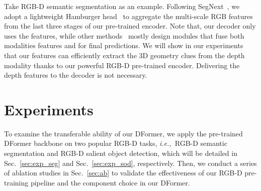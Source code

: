 \documentclass{article}
\newcommand{\secref}[1]{Sec.~\ref{#1}}
\def\ie{\emph{i.e.,~}}
\newcommand{\nMethod}{DFormer}
\begin{document}
Take RGB-D semantic segmentation as an example.
Following SegNext~\citep{guo2022segnext}, we adopt a lightweight Hamburger head~\citep{geng2021attention} to aggregate the multi-scale RGB features from the last three stages of our pre-trained encoder. 
Note that, our decoder only uses the  features, while other methods~\citep{zhang2022cmx,wang2022multimodal,zhang2023delivering} mostly design modules that fuse both modalities features  and  for final predictions.
We will show in our experiments that our  features can efficiently extract the 3D geometry clues from the depth modality thanks to our powerful RGB-D pre-trained encoder. 
Delivering the depth features  to the decoder is not necessary.































































\section{Experiments}\label{sec:experiment}




To examine the transferable ability of our \nMethod{}, we apply the pre-trained \nMethod{} backbone on two popular RGB-D tasks, \ie RGB-D semantic segmentation and RGB-D salient object detection, which will be detailed in \secref{sec:exp_seg} and \secref{sec:exp_sod}, respectively.
Then, we conduct a series of ablation studies in \secref{sec:ab} to validate the effectiveness of our RGB-D pre-training pipeline and the component choice in our \nMethod{}.
\end{document}
